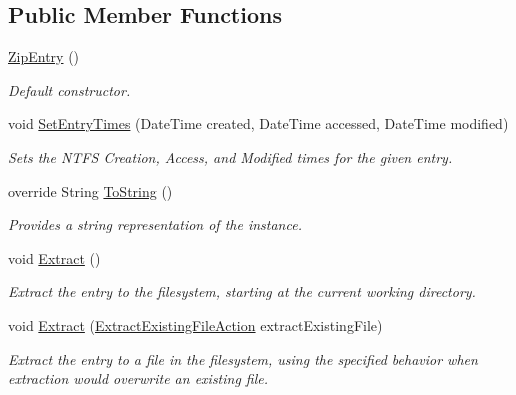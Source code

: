 \subsection*{Public Member Functions}
\begin{DoxyCompactItemize}
\item 
\mbox{\hyperlink{class_super_tiled2_unity_1_1_ionic_1_1_zip_1_1_zip_entry_a440b6d4d136b20dc6bdbdd399397e3a0}{Zip\+Entry}} ()
\begin{DoxyCompactList}\small\item\em Default constructor. \end{DoxyCompactList}\item 
void \mbox{\hyperlink{class_super_tiled2_unity_1_1_ionic_1_1_zip_1_1_zip_entry_a7331ca69b05c476a9d321b30d7649766}{Set\+Entry\+Times}} (Date\+Time created, Date\+Time accessed, Date\+Time modified)
\begin{DoxyCompactList}\small\item\em Sets the N\+T\+FS Creation, Access, and Modified times for the given entry. \end{DoxyCompactList}\item 
override String \mbox{\hyperlink{class_super_tiled2_unity_1_1_ionic_1_1_zip_1_1_zip_entry_a032c7cdd397cb85f1050c98745103f48}{To\+String}} ()
\begin{DoxyCompactList}\small\item\em Provides a string representation of the instance.\end{DoxyCompactList}\item 
void \mbox{\hyperlink{class_super_tiled2_unity_1_1_ionic_1_1_zip_1_1_zip_entry_a9d65543aadd23e47e188175412891b42}{Extract}} ()
\begin{DoxyCompactList}\small\item\em Extract the entry to the filesystem, starting at the current working directory. \end{DoxyCompactList}\item 
void \mbox{\hyperlink{class_super_tiled2_unity_1_1_ionic_1_1_zip_1_1_zip_entry_a0c740ca64fe50c0851e27d1324893ab9}{Extract}} (\mbox{\hyperlink{namespace_super_tiled2_unity_1_1_ionic_1_1_zip_a3f8db7242d746d36b45114257b4fe4c0}{Extract\+Existing\+File\+Action}} extract\+Existing\+File)
\begin{DoxyCompactList}\small\item\em Extract the entry to a file in the filesystem, using the specified behavior when extraction would overwrite an existing file. \end{DoxyCompactList}\item 

\end{DoxyCompactItemize}
